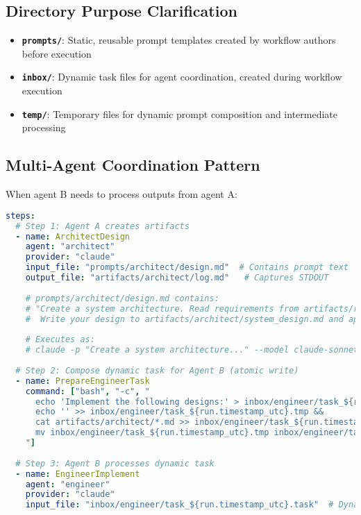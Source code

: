 \documentclass[11pt,a4paper]{article}
\begin{document}
\subsection{Directory Purpose Clarification}

\begin{itemize}
    \item \textbf{\texttt{prompts/}}: Static, reusable prompt templates created by workflow authors before execution
    \item \textbf{\texttt{inbox/}}: Dynamic task files for agent coordination, created during workflow execution
    \item \textbf{\texttt{temp/}}: Temporary files for dynamic prompt composition and intermediate processing
\end{itemize}

\subsection{Multi-Agent Coordination Pattern}

When agent B needs to process outputs from agent A:

\begin{lstlisting}[language=yaml, caption={Multi-Agent Coordination Pattern}]
steps:
  # Step 1: Agent A creates artifacts
  - name: ArchitectDesign
    agent: "architect"
    provider: "claude"
    input_file: "prompts/architect/design.md"  # Contains prompt text
    output_file: "artifacts/architect/log.md"   # Captures STDOUT
    
    # prompts/architect/design.md contains:
    # "Create a system architecture. Read requirements from artifacts/requirements/*.md
    #  Write your design to artifacts/architect/system_design.md and api_spec.md"
    
    # Executes as:
    # claude -p "Create a system architecture..." --model claude-sonnet-4-20250514 > artifacts/architect/log.md
    
  # Step 2: Compose dynamic task for Agent B (atomic write)
  - name: PrepareEngineerTask
    command: ["bash", "-c", "
      echo 'Implement the following designs:' > inbox/engineer/task_${run.timestamp_utc}.tmp &&
      echo '' >> inbox/engineer/task_${run.timestamp_utc}.tmp &&
      cat artifacts/architect/*.md >> inbox/engineer/task_${run.timestamp_utc}.tmp &&
      mv inbox/engineer/task_${run.timestamp_utc}.tmp inbox/engineer/task_${run.timestamp_utc}.task
    "]
    
  # Step 3: Agent B processes dynamic task
  - name: EngineerImplement
    agent: "engineer"
    provider: "claude"
    input_file: "inbox/engineer/task_${run.timestamp_utc}.task"  # Dynamically composed
\end{lstlisting}
\end{document}
